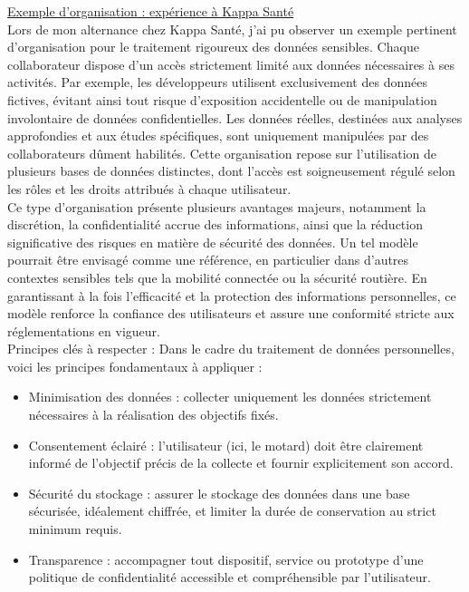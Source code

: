 \vspace{0.5cm}
\underline{Exemple d’organisation : expérience à Kappa Santé}\\
Lors de mon alternance chez Kappa Santé, j'ai pu observer un exemple pertinent d'organisation pour le traitement rigoureux des données sensibles. Chaque collaborateur dispose d'un accès strictement limité aux données nécessaires à ses activités. Par exemple, les développeurs utilisent exclusivement des données fictives, évitant ainsi tout risque d'exposition accidentelle ou de manipulation involontaire de données confidentielles.
Les données réelles, destinées aux analyses approfondies et aux études spécifiques, sont uniquement manipulées par des collaborateurs dûment habilités. Cette organisation repose sur l'utilisation de plusieurs bases de données distinctes, dont l'accès est soigneusement régulé selon les rôles et les droits attribués à chaque utilisateur.\\
Ce type d'organisation présente plusieurs avantages majeurs, notamment la discrétion, la confidentialité accrue des informations, ainsi que la réduction significative des risques en matière de sécurité des données. Un tel modèle pourrait être envisagé comme une référence, en particulier dans d'autres contextes sensibles tels que la mobilité connectée ou la sécurité routière. En garantissant à la fois l'efficacité et la protection des informations personnelles, ce modèle renforce la confiance des utilisateurs et assure une conformité stricte aux réglementations en vigueur.\\

Principes clés à respecter : Dans le cadre du traitement de données personnelles, voici les principes fondamentaux à appliquer :
\begin{itemize}
\item Minimisation des données : collecter uniquement les données strictement nécessaires à la réalisation des objectifs fixés.
\item Consentement éclairé : l'utilisateur (ici, le motard) doit être clairement informé de l'objectif précis de la collecte et fournir explicitement son accord.
\item Sécurité du stockage : assurer le stockage des données dans une base sécurisée, idéalement chiffrée, et limiter la durée de conservation au strict minimum requis.
\item Transparence : accompagner tout dispositif, service ou prototype d'une politique de confidentialité accessible et compréhensible par l'utilisateur.
\end{itemize}

